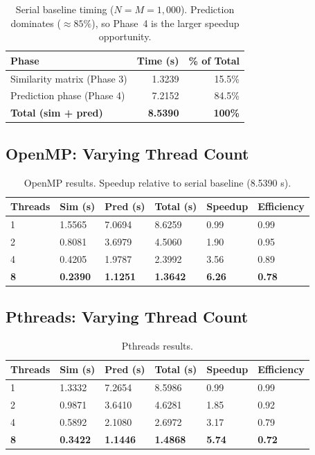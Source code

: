 \documentclass[11pt,a4paper]{article}
\begin{document}
\begin{table}[!htbp]
\centering
\begin{tabular}{lrr}
\toprule
\textbf{Phase} & \textbf{Time (s)} & \textbf{\% of Total} \\
\midrule
Similarity matrix (Phase 3) & 1.3239 & 15.5\% \\
Prediction phase (Phase 4)  & 7.2152 & 84.5\% \\
\textbf{Total (sim + pred)} & \textbf{8.5390} & \textbf{100\%} \\
\bottomrule
\end{tabular}
\caption{Serial baseline timing ($N=M=1{,}000$). Prediction dominates ($\approx 85\%$), so Phase~4 is the larger speedup opportunity.}
\end{table}

\subsection{OpenMP: Varying Thread Count}

\begin{table}[!htbp]
\centering
\begin{tabular}{C{1.8cm} R{1.9cm} R{1.9cm} R{2.0cm} R{1.9cm} R{2.2cm}}
\toprule
\textbf{Threads} & \textbf{Sim (s)} & \textbf{Pred (s)} &
\textbf{Total (s)} & \textbf{Speedup} & \textbf{Efficiency} \\
 & 1.5565 & 7.0694 & 8.6259 & 0.99 & 0.99 \\
2 & 0.8081 & 3.6979 & 4.5060 & 1.90 & 0.95 \\
4 & 0.4205 & 1.9787 & 2.3992 & 3.56 & 0.89 \\
\textbf{8} & \textbf{0.2390} & \textbf{1.1251} & \textbf{1.3642} & \textbf{6.26} & \textbf{0.78} \\
\bottomrule
\end{tabular}
\caption{OpenMP results. Speedup relative to serial baseline (8.5390 s).}
\end{table}

\subsection{Pthreads: Varying Thread Count}

\begin{table}[!htbp]
\centering
\begin{tabular}{C{1.8cm} R{1.9cm} R{1.9cm} R{2.0cm} R{1.9cm} R{2.2cm}}
\toprule
\textbf{Threads} & \textbf{Sim (s)} & \textbf{Pred (s)} &
\textbf{Total (s)} & \textbf{Speedup} & \textbf{Efficiency} \\
 & 1.3332 & 7.2654 & 8.5986 & 0.99 & 0.99 \\
2 & 0.9871 & 3.6410 & 4.6281 & 1.85 & 0.92 \\
4 & 0.5892 & 2.1080 & 2.6972 & 3.17 & 0.79 \\
\textbf{8} & \textbf{0.3422} & \textbf{1.1446} & \textbf{1.4868} & \textbf{5.74} & \textbf{0.72} \\
\bottomrule
\end{tabular}
\caption{Pthreads results.}
\end{table}
\end{document}
